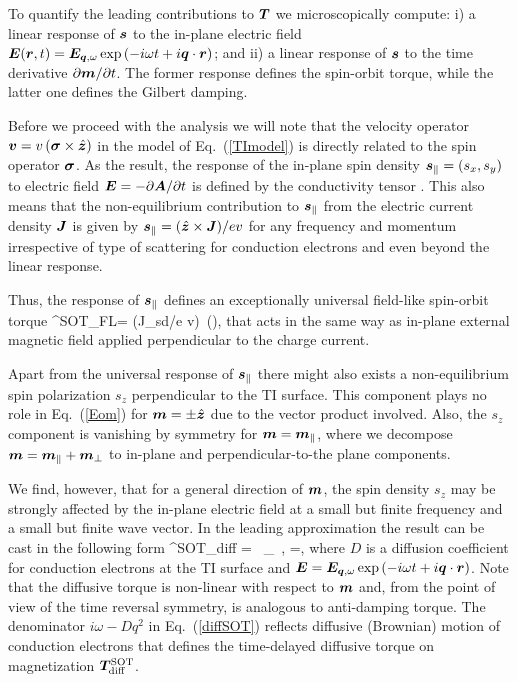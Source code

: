 To quantify the leading contributions to $\boldsymbol{T}$ we microscopically compute: i) a linear response of $\boldsymbol{s}$ to the in-plane electric field $\boldsymbol{E}(\boldsymbol{r},t)= \boldsymbol{E}_{\boldsymbol{q},\omega}\exp\left(-i\omega t+i\boldsymbol{q}\cdot\boldsymbol{r}\right)$; and ii) a linear response of $\boldsymbol{s}$ to the time derivative $\partial \boldsymbol{m}/\partial t$. The former response defines the spin-orbit torque, while the latter one defines the Gilbert damping. 
 
Before we proceed with the analysis we will note that the velocity operator $\boldsymbol{v} = v\,(\boldsymbol{\sigma}\times \hat{\boldsymbol{z}})$ in the model of Eq.~(\ref{TImodel})  is directly related to the spin operator $\boldsymbol{\sigma}$. As the result, the response of the in-plane spin density $\boldsymbol{s}_\parallel=(s_{x}, s_{y})$ to electric field $\boldsymbol{E}=-\partial\boldsymbol{A}/\partial t$ is defined by the conductivity tensor \cite{ndiaye_dirac_2017,Ghosh18}. This also means that the non-equilibrium contribution to $\boldsymbol{s}_\parallel$ from the electric current density $\boldsymbol{J}$ is given by $\boldsymbol{s}_\parallel= (\hat{\boldsymbol{z}}\times\boldsymbol{J} )/ev$ for any frequency and momentum irrespective of type of scattering for conduction electrons and even beyond the linear response. 

Thus, the response of $\boldsymbol{s}_\parallel$ defines an exceptionally universal field-like spin-orbit torque
\be
\label{TFL}
^\textrm{SOT}_\textrm{FL}= (J_\textrm{sd}/\hslash e v)\, \times(\times{}),
\e 
that acts in the same way as in-plane external magnetic field applied perpendicular to the charge current. 

Apart from the universal response of $\boldsymbol{s}_\parallel$ there might also exists a non-equilibrium spin polarization $s_z$ perpendicular to the TI surface. This component plays no role in Eq.~(\ref{Eom}) for $\boldsymbol{m}= \pm \hat{\boldsymbol{z}}$ due to the vector product involved. Also, the $s_z$ component is vanishing by symmetry for $\boldsymbol{m}=\boldsymbol{m}_\parallel$, where we decompose $\boldsymbol{m} =\boldsymbol{m}_\parallel+\boldsymbol{m}_\perp$ to in-plane and perpendicular-to-the plane components.

We find, however, that for a general direction of $\boldsymbol{m}$, the spin density $s_z$ may be strongly affected by the in-plane electric field at a small but finite frequency and a small but finite wave vector. In the leading approximation the result can be cast in the following form 
\be
\label{diffSOT}
^\textrm{SOT}_\textrm{diff} = \eta\, \times{}_\perp\, ,\quad
\eta=,
\e
where $D$ is a diffusion coefficient for conduction electrons at the TI surface and $\boldsymbol{E}= \boldsymbol{E}_{\boldsymbol{q},\omega}\exp\left(-i\omega t+i\boldsymbol{q}\cdot\boldsymbol{r}\right)$. Note that the diffusive torque is non-linear with respect to $\boldsymbol{m}$ and, from the point of view of the time reversal symmetry, is analogous to anti-damping torque. The denominator $i\omega -Dq^2$ in Eq.~(\ref{diffSOT}) reflects diffusive (Brownian) motion of conduction electrons that defines the time-delayed diffusive torque on magnetization $\boldsymbol{T}^\textrm{SOT}_\textrm{diff}$.  

